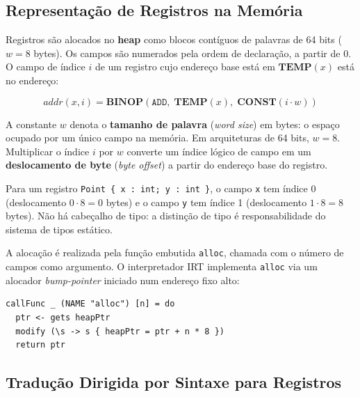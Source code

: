 \subsection{Representação de Registros na Memória}
\label{sec:ir-record-layout}

Registros são alocados no \textbf{heap} como blocos contíguos de palavras
de 64 bits (\(w = 8\) bytes). Os campos são numerados pela ordem de
declaração, a partir de 0. O campo de índice \(i\) de um registro cujo
endereço base está em \(\mathbf{TEMP}(x)\) está no endereço:

\[
  \mathit{addr}(x, i) = \mathbf{BINOP}(\mathtt{ADD},\; \mathbf{TEMP}(x),\;
  \mathbf{CONST}(i \cdot w))
\]

\begin{remark}
  A constante \(w\) denota o \textbf{tamanho de palavra} (\emph{word size})
  em bytes: o espaço ocupado por um único campo na memória.  Em arquiteturas
  de 64 bits, \(w = 8\).  Multiplicar o índice \(i\) por \(w\) converte um
  índice lógico de campo em um \textbf{deslocamento de byte} (\emph{byte
  offset}) a partir do endereço base do registro.
\end{remark}

Para um registro \texttt{Point \{ x : int; y : int \}}, o campo \texttt{x}
tem índice 0 (deslocamento \(0 \cdot 8 = 0\) bytes) e o campo \texttt{y}
tem índice 1 (deslocamento \(1 \cdot 8 = 8\) bytes). Não há cabeçalho de
tipo: a distinção de tipo é responsabilidade do sistema de tipos estático.

A alocação é realizada pela função embutida \texttt{alloc}, chamada com
o número de campos como argumento. O interpretador IRT implementa
\texttt{alloc} via um alocador \emph{bump-pointer} iniciado num endereço
fixo alto:

\begin{verbatim}
callFunc _ (NAME "alloc") [n] = do
  ptr <- gets heapPtr
  modify (\s -> s { heapPtr = ptr + n * 8 })
  return ptr
\end{verbatim}

\subsection{Tradução Dirigida por Sintaxe para Registros}
\label{sec:ir-record-sdt}

